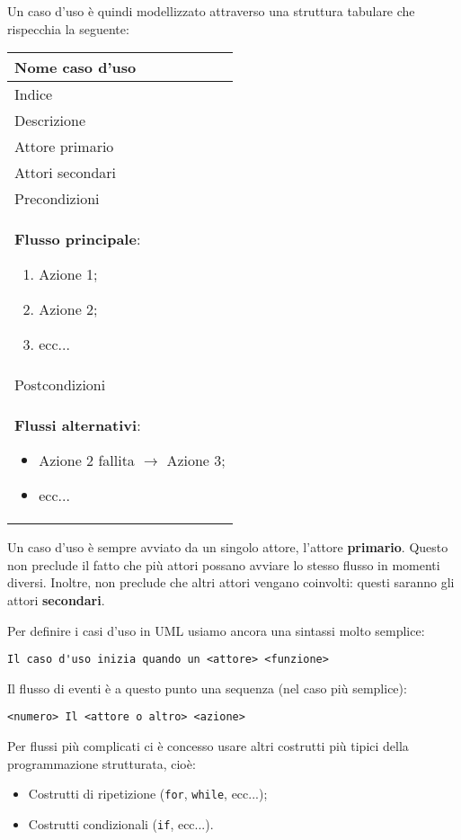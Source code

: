 \documentclass[a4paper,11pt]{article}
\begin{document}
Un caso d'uso è quindi modellizzato attraverso una struttura tabulare che rispecchia la seguente:
\begin{table}[H]
	\center 
	\begin{tabular} { | p{10cm} | }
		\hline
		\bfseries Nome caso d'uso \\ 
		\hline
		Indice \\ 
		\hline
		Descrizione \\ 
		\hline
		Attore primario \\ 
		\hline
		Attori secondari \\ 
		\hline
		Precondizioni \\
		\hline
		\textbf{Flusso principale}:
		\begin{enumerate}
			\item Azione 1;
			\item Azione 2;
			\item ecc...
		\end{enumerate} \\
		\hline
		Postcondizioni \\ 
		\hline
		\textbf{Flussi alternativi}:
		\begin{itemize}
			\item Azione 2 fallita $\rightarrow$ Azione 3;
			\item ecc...
		\end{itemize} \\
		\hline
	\end{tabular}
\end{table}

Un caso d'uso è sempre avviato da un singolo attore, l'attore \textbf{primario}. Questo non preclude il fatto che più attori possano avviare lo stesso flusso in momenti diversi. Inoltre, non preclude che altri attori vengano coinvolti: questi saranno gli attori \textbf{secondari}.

Per definire i casi d'uso in UML usiamo ancora una sintassi molto semplice:
\begin{lstlisting}[style=codestyle]	
Il caso d'uso inizia quando un <attore> <funzione>
\end{lstlisting}

Il flusso di eventi è a questo punto una sequenza (nel caso più semplice):
\begin{lstlisting}[style=codestyle]	
<numero> Il <attore o altro> <azione>
\end{lstlisting}
Per flussi più complicati ci è concesso usare altri costrutti più tipici della programmazione strutturata, cioè:
\begin{itemize}
	\item Costrutti di ripetizione (\lstinline|for|, \lstinline|while|, ecc...);
	\item Costrutti condizionali (\lstinline|if|, ecc...).
\end{itemize}
\end{document}
